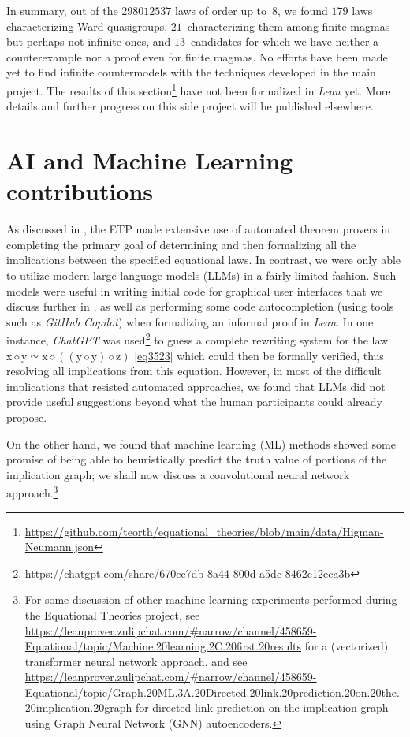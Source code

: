 \documentclass[12pt]{amsart}
\theoremstyle{definition}
\newcommand{\x}{\mathrm{x}}
\newcommand{\y}{\mathrm{y}}
\newcommand{\z}{\mathrm{z}}
\newcommand{\op}{\diamond}
\newcommand{\formaleq}{\simeq}
\begin{document}
In summary, out of the $\num{298012537}$ laws of order up to~$8$, we found $179$ laws characterizing Ward quasigroups, $21$~characterizing them among finite magmas but perhaps not infinite ones, and $13$~candidates for which we have neither a counterexample nor a proof even for finite magmas. No efforts have been made yet to find infinite countermodels with the techniques developed in the main project. The results of this section\footnote{\url{https://github.com/teorth/equational_theories/blob/main/data/Higman-Neumann.json}} have not been formalized in \emph{Lean} yet. More details and further progress on this side project will be published elsewhere.

\section{AI and Machine Learning contributions}\label{ml-sec}

As discussed in , the ETP made extensive use of automated theorem provers in completing the primary goal of determining and then formalizing all the implications between the specified equational laws.  In contrast, we were only able to utilize modern large language models (LLMs) in a fairly limited fashion.  Such models were useful in writing initial code for graphical user interfaces that we discuss further in , as well as performing some code autocompletion (using tools such as \emph{GitHub Copilot}) when formalizing an informal proof in \emph{Lean}.  In one instance, \emph{ChatGPT} was used\footnote{\url{https://chatgpt.com/share/670ce7db-8a44-800d-a5dc-8462c12eca3b}} to guess a complete rewriting system for the law $\x \op \y \formaleq \x \op ((\y \op \y) \op \z)$ \eqref{eq3523} which could then be formally verified, thus resolving all implications from this equation. However, in most of the difficult implications that resisted automated approaches, we found that LLMs did not provide useful suggestions beyond what the human participants could already propose.

On the other hand, we found that machine learning (ML) methods showed some promise of being able to heuristically predict the truth value of portions of the implication graph; we shall now discuss a convolutional neural network approach.\footnote{For some discussion of other machine learning experiments performed during the Equational Theories project, see \url{https://leanprover.zulipchat.com/\#narrow/channel/458659-Equational/topic/Machine.20learning.2C.20first.20results} for a (vectorized) transformer neural network approach, and see \url{https://leanprover.zulipchat.com/\#narrow/channel/458659-Equational/topic/Graph.20ML.3A.20Directed.20link.20prediction.20on.20the.20implication.20graph} for directed link prediction on the implication graph using Graph Neural Network (GNN) autoencoders.}
\end{document}

